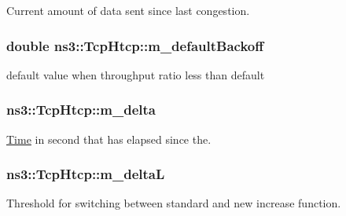 Current amount of data sent since last congestion. 

\subsubsection[{\texorpdfstring{m\+\_\+default\+Backoff}{m_defaultBackoff}}]{\setlength{\rightskip}{0pt plus 5cm}double ns3\+::\+Tcp\+Htcp\+::m\+\_\+default\+Backoff\hspace{0.3cm}{\ttfamily [private]}}\hypertarget{classns3_1_1TcpHtcp_a1aa22561875c042fe0bd39ca66544587}{}\label{classns3_1_1TcpHtcp_a1aa22561875c042fe0bd39ca66544587}


default value when throughput ratio less than default 

\subsubsection[{\texorpdfstring{m\+\_\+delta}{m_delta}}]{ ns3\+::\+Tcp\+Htcp\+::m\+\_\+delta\hspace{0.3cm}{\ttfamily [private]}}\hypertarget{classns3_1_1TcpHtcp_a4642b12b72c7388148dd364d9117a129}{}\label{classns3_1_1TcpHtcp_a4642b12b72c7388148dd364d9117a129}


\hyperlink{classns3_1_1Time}{Time} in second that has elapsed since the. 

\subsubsection[{\texorpdfstring{m\+\_\+deltaL}{m_deltaL}}]{ ns3\+::\+Tcp\+Htcp\+::m\+\_\+deltaL\hspace{0.3cm}{\ttfamily [private]}}\hypertarget{classns3_1_1TcpHtcp_a7e13ad28ae35566e894b5e7ae279dae5}{}\label{classns3_1_1TcpHtcp_a7e13ad28ae35566e894b5e7ae279dae5}


Threshold for switching between standard and new increase function. 

